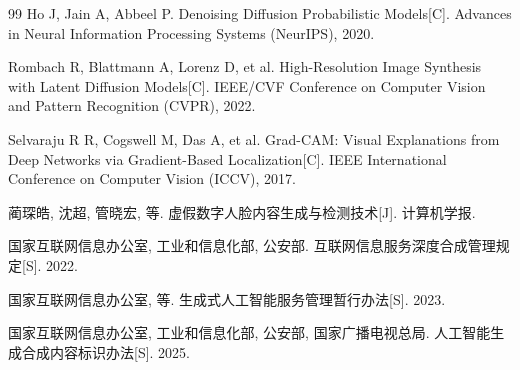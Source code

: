 \begin{thebibliography}{99}
 Ho J, Jain A, Abbeel P. Denoising Diffusion Probabilistic Models[C]. Advances in Neural Information Processing Systems (NeurIPS), 2020.

 Rombach R, Blattmann A, Lorenz D, et al. High-Resolution Image Synthesis with Latent Diffusion Models[C]. IEEE/CVF Conference on Computer Vision and Pattern Recognition (CVPR), 2022.

 Selvaraju R R, Cogswell M, Das A, et al. Grad-CAM: Visual Explanations from Deep Networks via Gradient-Based Localization[C]. IEEE International Conference on Computer Vision (ICCV), 2017.

 蔺琛皓, 沈超, 管晓宏, 等. 虚假数字人脸内容生成与检测技术[J]. 计算机学报.

 国家互联网信息办公室, 工业和信息化部, 公安部. 互联网信息服务深度合成管理规定[S]. 2022.

 国家互联网信息办公室, 等. 生成式人工智能服务管理暂行办法[S]. 2023.

 国家互联网信息办公室, 工业和信息化部, 公安部, 国家广播电视总局. 人工智能生成合成内容标识办法[S]. 2025.

\end{thebibliography}
